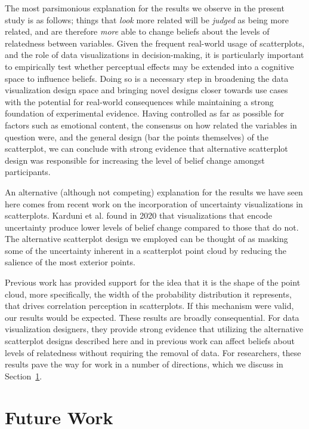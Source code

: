 \documentclass[sigconf]{acmart}
\begin{document}
The most parsimonious explanation for the results we observe in the
present study is as follows; things that \emph{look} more related will
be \emph{judged} as being more related, and are therefore \emph{more}
able to change beliefs about the levels of relatedness between
variables. Given the frequent real-world usage of scatterplots, and the
role of data visualizations in decision-making, it is particularly
important to empirically test whether perceptual effects may be extended
into a cognitive space to influence beliefs. Doing so is a necessary
step in broadening the data visualization design space and bringing
novel designs closer towards use cases with the potential for real-world
consequences while maintaining a strong foundation of experimental
evidence. Having controlled as far as possible for factors such as
emotional content, the consensus on how related the variables in
question were, and the general design (bar the points themselves) of the
scatterplot, we can conclude with strong evidence that alternative
scatterplot design was responsible for increasing the level of belief
change amongst participants.

An alternative (although not competing) explanation for the results we
have seen here comes from recent work on the incorporation of
uncertainty visualizations in scatterplots. Karduni et al.
\citep{karduni_2020} found in 2020 that visualizations that encode
uncertainty produce lower levels of belief change compared to those that
do not. The alternative scatterplot design we employed can be thought of
as masking some of the uncertainty inherent in a scatterplot point cloud
by reducing the salience of the most exterior points.

Previous work has provided support for the idea that it is the shape of
the point cloud, more specifically, the width of the probability
distribution it represents, that drives correlation perception in
scatterplots. If this mechanism were valid, our results would be
expected. These results are broadly consequential. For data
visualization designers, they provide strong evidence that utilizing the
alternative scatterplot designs described here and in previous work can
affect beliefs about levels of relatedness without requiring the removal
of data. For researchers, these results pave the way for work in a
number of directions, which we discuss in Section~\ref{sec-future-work}.

\section{Future Work}\label{sec-future-work}
\end{document}
